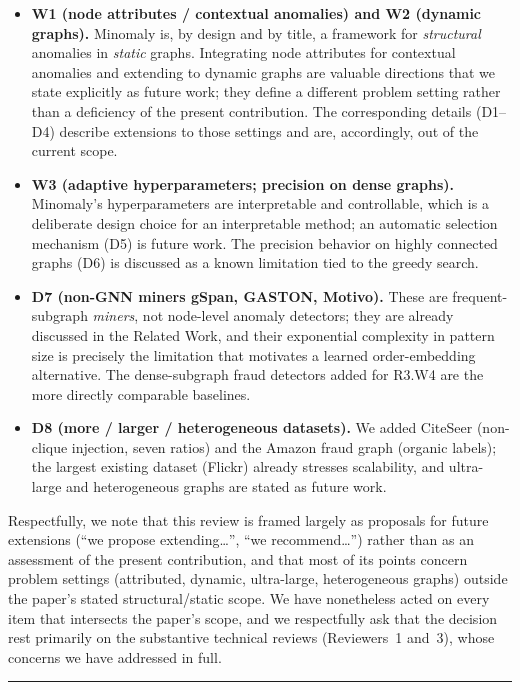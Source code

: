 \documentclass[11pt]{article}
\begin{document}
\begin{itemize}
  \item \textbf{W1 (node attributes / contextual anomalies) and W2 (dynamic graphs).} Minomaly is, by design and by title, a framework for \emph{structural} anomalies in \emph{static} graphs. Integrating node attributes for contextual anomalies and extending to dynamic graphs are valuable directions that we state explicitly as future work; they define a different problem setting rather than a deficiency of the present contribution. The corresponding details (D1--D4) describe extensions to those settings and are, accordingly, out of the current scope.
  \item \textbf{W3 (adaptive hyperparameters; precision on dense graphs).} Minomaly's hyperparameters are interpretable and controllable, which is a deliberate design choice for an interpretable method; an automatic selection mechanism (D5) is future work. The precision behavior on highly connected graphs (D6) is discussed as a known limitation tied to the greedy search.
  \item \textbf{D7 (non-GNN miners gSpan, GASTON, Motivo).} These are frequent-subgraph \emph{miners}, not node-level anomaly detectors; they are already discussed in the Related Work, and their exponential complexity in pattern size is precisely the limitation that motivates a learned order-embedding alternative. The dense-subgraph fraud detectors added for R3.W4 are the more directly comparable baselines.
  \item \textbf{D8 (more / larger / heterogeneous datasets).} We added CiteSeer (non-clique injection, seven ratios) and the Amazon fraud graph (organic labels); the largest existing dataset (Flickr) already stresses scalability, and ultra-large and heterogeneous graphs are stated as future work.
\end{itemize}

Respectfully, we note that this review is framed largely as proposals for future extensions (``we propose extending\dots'', ``we recommend\dots'') rather than as an assessment of the present contribution, and that most of its points concern problem settings (attributed, dynamic, ultra-large, heterogeneous graphs) outside the paper's stated structural/static scope. We have nonetheless acted on every item that intersects the paper's scope, and we respectfully ask that the decision rest primarily on the substantive technical reviews (Reviewers~1 and~3), whose concerns we have addressed in full.

\vspace{8pt}\noindent\rule{\textwidth}{0.4pt}
\end{document}
